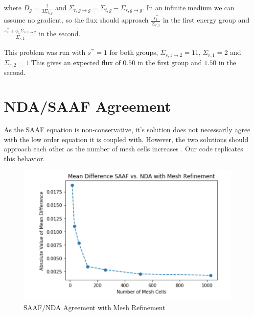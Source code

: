 where $D_g = \frac{1}{3\Sigma_{t, g}}$ and $\Sigma_{r, g \rightarrow g} = \Sigma_{t, g} - \Sigma_{s, g \rightarrow g}$. In an infinite medium we can assume no gradient, so the flux should approach $\frac{s_1^{'''}}{\Sigma_{r, 1}}$ in the first energy group and $\frac{s_2^{'''} + \phi_1 \Sigma_{s, 1 \rightarrow 2}}{\Sigma_{r, 2}}$ in the second.  

This problem was run with $ s^{'''} = 1$ for both groups, $\Sigma_{s, 1\rightarrow 2} = 11$, $\Sigma_{r, 1} = 2$ and $\Sigma_{r, 2} = 1$ This gives an expected flux of $0.50 $ in the first group and $1.50$ in the second. 

\section{NDA/SAAF Agreement}
As the SAAF equation is non-conservative, it's solution does not necessarily agree with the low order equation it is coupled with. However, the two solutions should approach each other as the number of mesh cells increases \cite{Wang2013}. Our code replicates this behavior. 
\begin{figure}
    \centering
    \includegraphics[width=.75\textwidth]{fig/SAAFvsNDA}
    \caption{SAAF/NDA Agreement with Mesh Refinement}
    \label{fig:SAAFvsNDA}
\end{figure}